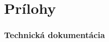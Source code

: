 \documentclass[11pt,twoside,slovak,a4paper]{article}
\begin{document}
    \newpage
 	\pagestyle{fancy}
 	\fancyhf{}
 	\fancyfoot[CE,CO]{\thepage}
 	
 	
 	
 	\newpage
 	\thispagestyle{plain}
 	\part*{Prílohy}
	\renewcommand\thesection{\Alph{section}}
	\setcounter{section}{0}
 	\section{Technická dokumentácia}
 	
 	
 	
 	
\end{document}
